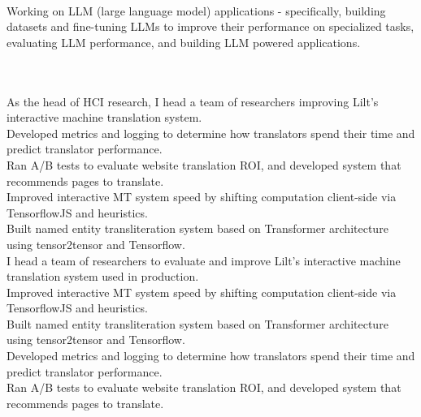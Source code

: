 
\\
Working on LLM (large language model) applications - specifically, building datasets and fine-tuning LLMs to improve their performance on specialized tasks, evaluating LLM performance, and building LLM powered applications.\\

\vspace{-1mm}

\\
\\
\ifdefined\hci
As the head of HCI research, I head a team of researchers improving Lilt's interactive machine translation system.\\
Developed metrics and logging to determine how translators spend their time and predict translator performance.\\
Ran A/B tests to evaluate website translation ROI, and developed system that recommends pages to translate. \\
Improved interactive MT system speed by shifting computation client-side via TensorflowJS and heuristics.\\
Built named entity transliteration system based on Transformer architecture using tensor2tensor and Tensorflow.\\  
\else
I head a team of researchers to evaluate and improve Lilt's interactive machine translation system used in production.\\
Improved interactive MT system speed by shifting computation client-side via TensorflowJS and heuristics.\\
Built named entity transliteration system based on Transformer architecture using tensor2tensor and Tensorflow.\\
Developed metrics and logging to determine how translators spend their time and predict translator performance.\\
Ran A/B tests to evaluate website translation ROI, and developed system that recommends pages to translate. \\
\fi

